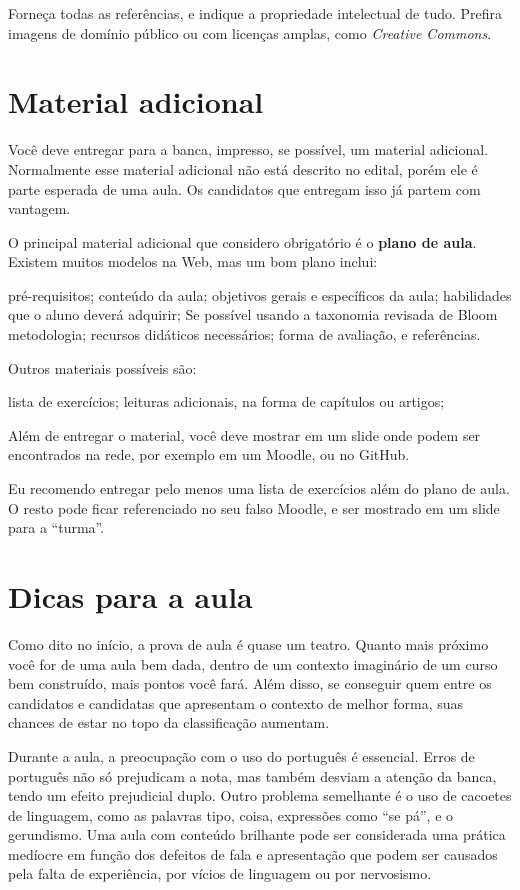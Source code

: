 \documentclass{article}
\begin{document}
Forneça todas as referências, e indique a propriedade intelectual de tudo. Prefira imagens de domínio público ou com licenças amplas, como \textit{Creative Commons}.

\section{Material adicional}

Você deve entregar para a banca, impresso, se possível, um material adicional. Normalmente esse material adicional não está descrito no edital, porém ele é parte esperada de uma aula. Os candidatos que entregam isso já partem com vantagem.

O principal material adicional que considero obrigatório é o \textbf{plano de aula}. Existem muitos modelos na Web, mas um bom plano inclui:
\begin{outline}
\1 pré-requisitos;
\1 conteúdo da aula;
\1 objetivos gerais e específicos da aula;
\1 habilidades que o aluno deverá adquirir;
\2 Se possível usando a taxonomia revisada de Bloom
\1 metodologia;
\1 recursos didáticos necessários;
\1 forma de avaliação, e
\1 referências.
\end{outline}

Outros materiais possíveis são:
\begin{outline}
\1 lista de exercícios;
\1 leituras adicionais, na forma de capítulos ou artigos;
\end{outline}

Além de entregar o material, você deve mostrar em um slide onde podem ser encontrados na rede, por exemplo em um Moodle, ou no GitHub.

Eu recomendo entregar pelo menos uma lista de exercícios além do plano de aula. O resto pode ficar referenciado no seu falso Moodle, e ser mostrado em um slide para a ``turma''.


\section{Dicas para a aula}

Como dito no início, a prova de aula é quase um teatro. Quanto mais próximo você for de uma aula bem dada, dentro de um contexto imaginário de um curso bem construído, mais pontos você fará. Além disso, se conseguir quem entre os candidatos e candidatas que apresentam o contexto de melhor forma, suas chances de estar no topo da classificação aumentam.

Durante a aula, a preocupação com o uso do português é essencial. Erros de português não só prejudicam a nota, mas também desviam a atenção da banca, tendo um efeito prejudicial duplo. Outro problema semelhante é o uso de cacoetes de linguagem, como as palavras tipo, coisa, expressões como ``se pá'', e o gerundismo. Uma aula com conteúdo brilhante pode ser considerada  uma prática medíocre em função dos defeitos de fala e apresentação que podem ser causados pela falta de experiência, por vícios de linguagem ou por nervosismo.
\end{document}
